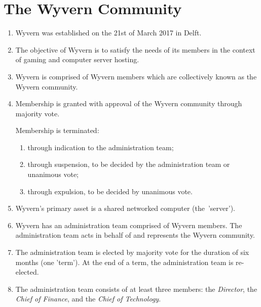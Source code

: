 \section{The Wyvern Community}
\label{sec:wyvern-community}
\begin{enumerate}
    \item Wyvern was established on the 21st of March 2017 in Delft.

    \item The objective of Wyvern is to satisfy the needs of its members in the context of gaming and computer server hosting.

    \item Wyvern is comprised of Wyvern members which are collectively known as the Wyvern community.

    \item Membership is granted with approval of the Wyvern community through majority vote.
    
    \begin{item}
        Membership is terminated:
        \begin{enumerate}
            \item through indication to the administration team;
            \item through suspension, to be decided by the administration team or unanimous vote;
            \item through expulsion, to be decided by unanimous vote.
        \end{enumerate}
    \end{item}

    \item Wyvern's primary asset is a shared networked computer (the~'server').

    \item Wyvern has an administration team comprised of Wyvern members. The administration team acts in behalf of and represents the Wyvern community.

    \item The administration team is elected by majority vote for the duration of six months (one 'term'). At the end of a term, the administration team is re-elected.

    \item The administration team consists of at least three members: the \emph{Director}, the \emph{Chief of Finance}, and the \emph{Chief of Technology}.


\end{enumerate}
